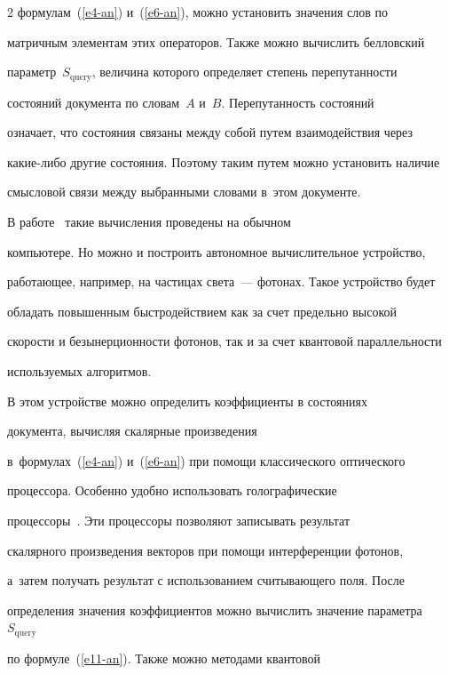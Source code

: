\begin{multicols}{2}
формулам~(\ref{e4-an}) и~(\ref{e6-an}), можно установить значения слов по 


матричным элементам этих операторов. Также можно вычислить белловский 


параметр~$S_{\mathrm{query}}$, величина которого определяет степень пе\-ре\-пу\-тан\-ности 


состояний документа по словам~$A$ и~$B$. Перепутанность состояний 


означает, что со\-сто\-яния связаны между собой путем взаимодействия через 


ка\-кие-ли\-бо другие со\-сто\-яния. Поэтому таким путем мож\-но установить наличие 


смысловой связи между выбранными словами в~этом до\-ку\-менте. 


    


    В работе~\cite{6-an} такие вычисления проведены на обычном 


компьютере. Но можно и по\-стро\-ить автономное вы\-чис\-ли\-тель\-ное устройство, 


работающее, например, на час\-ти\-цах света~--- фотонах. Такое устройство будет 


обладать повышенным быст\-ро\-дей\-ст\-ви\-ем как за счет предельно высокой 


ско\-рости и безынер\-ци\-он\-ности фотонов, так и за счет кван\-то\-вой па\-рал\-лель\-ности 


ис\-поль\-зу\-емых алгоритмов.


    


    В этом устройстве можно определить коэффициенты в состояниях 


документа, вычисляя скалярные произведения  


в~формулах~(\ref{e4-an}) и~(\ref{e6-an}) при помощи классического оптического 


процессора. Особенно удоб\-но использовать голографические 


процессоры~\cite{7-an, 8-an}. Эти процессоры позволяют записывать результат 


скалярного произведения векторов при помощи интерференции фотонов, 


а~затем получать результат с использованием счи\-ты\-ва\-юще\-го поля. После 


определения значения коэффициентов можно вы\-чис\-лить значение па\-ра\-мет\-ра~$S_{\mathrm{query}}$ 


по формуле~(\ref{e11-an}). Так\-же мож\-но методами квантовой 



\end{multicols}
